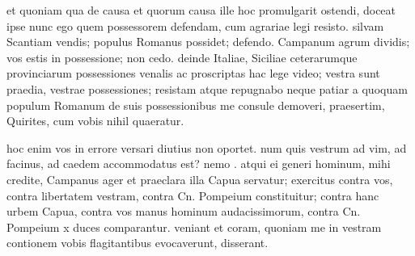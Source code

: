  et quoniam qua de causa et quorum causa ille hoc promulgarit ostendi, doceat ipse nunc ego quem possessorem defendam, cum agrariae legi resisto. silvam Scantiam vendis; populus Romanus possidet; defendo. Campanum agrum dividis; vos estis in possessione; non cedo. deinde Italiae, Siciliae ceterarumque provinciarum possessiones venalis ac proscriptas hac lege video; vestra sunt praedia, vestrae possessiones; resistam atque repugnabo neque patiar a quoquam populum Romanum de suis possessionibus me consule demoveri, praesertim, Quirites, cum vobis nihil quaeratur.

 hoc enim vos in errore versari diutius non oportet. num quis vestrum ad vim, ad facinus, ad caedem accommodatus est? nemo . atqui ei generi hominum, mihi credite, Campanus ager et praeclara illa Capua servatur; exercitus contra vos, contra libertatem vestram, contra Cn. Pompeium constituitur; contra hanc urbem Capua, contra vos manus hominum audacissimorum, contra Cn. Pompeium x duces comparantur. veniant et coram, quoniam me in vestram contionem vobis flagitantibus evocaverunt, disserant.
